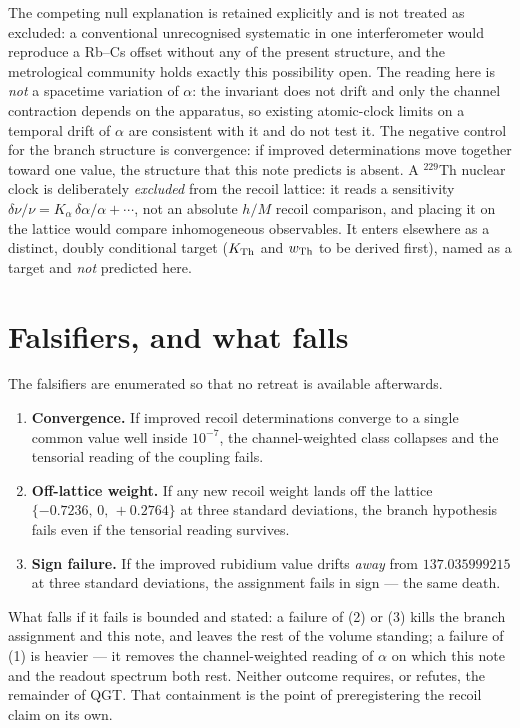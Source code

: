 \documentclass[11pt]{article}
\begin{document}
The competing null explanation is retained explicitly and is not treated as
excluded: a conventional unrecognised systematic in one interferometer would
reproduce a Rb--Cs offset without any of the present structure, and the
metrological community holds exactly this possibility open. The reading here is
\emph{not} a spacetime variation of $\alpha$: the invariant does not drift and
only the channel contraction depends on the apparatus, so existing atomic-clock
limits on a temporal drift of $\alpha$ are consistent with it and do not test it.
The negative control for the branch structure is convergence: if improved
determinations move together toward one value, the structure that this note
predicts is absent. A $^{229}$Th nuclear clock is deliberately \emph{excluded}
from the recoil lattice: it reads a sensitivity $\delta\nu/\nu=K_\alpha\,
\delta\alpha/\alpha+\cdots$, not an absolute $h/M$ recoil comparison, and placing
it on the lattice would compare inhomogeneous observables. It enters elsewhere as
a distinct, doubly conditional target ($K_{\rm Th}$ and $w_{\rm Th}$ to be
derived first), named as a target and \emph{not} predicted here.

\section{Falsifiers, and what falls}

The falsifiers are enumerated so that no retreat is available afterwards.

\begin{enumerate}[leftmargin=1.6em,itemsep=2pt]
\item \textbf{Convergence.} If improved recoil determinations converge to a single
common value well inside $10^{-7}$, the channel-weighted class collapses and the
tensorial reading of the coupling fails.
\item \textbf{Off-lattice weight.} If any new recoil weight lands off the lattice
$\{-0.7236,\,0,\,+0.2764\}$ at three standard deviations, the branch hypothesis
fails even if the tensorial reading survives.
\item \textbf{Sign failure.} If the improved rubidium value drifts \emph{away}
from $137.035999215$ at three standard deviations, the assignment fails in sign
--- the same death.
\end{enumerate}

\noindent What falls if it fails is bounded and stated: a failure of (2) or (3)
kills the branch assignment and this note, and leaves the rest of the volume
standing; a failure of (1) is heavier --- it removes the channel-weighted reading
of $\alpha$ on which this note and the readout spectrum both rest. Neither outcome
requires, or refutes, the remainder of QGT. That containment is the point of
preregistering the recoil claim on its own.
\end{document}
